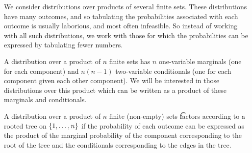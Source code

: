 
\sbasic











































\sstart
{}


We consider distributions over products of several finite sets.
These distributions have many outcomes, and so tabulating the probabilities associated with each outcome is usually laborious, and most often infeasible.
So instead of working with all such distributions, we work with those for which the probabilities can be expressed by tabulating fewer numbers.


A distribution over a product of $n$ finite sets has $n$ one-variable marginals (one for each component) and $n(n-1)$ two-variable conditionals (one for each component given each other component).
We will be interested in those distributions over this product which can be written as a product of these marginals and conditionals.

A distribution over a product of $n$ finite (non-empty) sets \t{factors according to a rooted tree} on $\{1, \dots, n\}$ if the probability of each outcome can be expressed as the product of the marginal probability of the component corresponding to the root of the tree and the conditionals corresponding to the edges in the tree.

